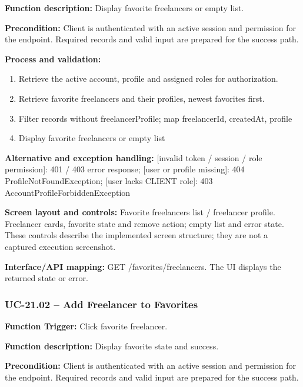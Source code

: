 \textbf{Function description:} Display favorite freelancers or empty list.

\textbf{Precondition:} Client is authenticated with an active session and permission for the endpoint. Required records and valid input are prepared for the success path.

\textbf{Process and validation:}
\begin{enumerate}
\item Retrieve the active account, profile and assigned roles for authorization.
\item Retrieve favorite freelancers and their profiles, newest favorites first.
\item Filter records without freelancer\allowbreak{}Profile; map freelancer\allowbreak{}Id, created\allowbreak{}At, profile
\item Display favorite freelancers or empty list
\end{enumerate}
\textbf{Alternative and exception handling:} [invalid token /\allowbreak{} session /\allowbreak{} role permission]: 401 /\allowbreak{} 403 error response; [user or profile missing]: 404 Profile\allowbreak{}Not\allowbreak{}Found\allowbreak{}Exception; [user lacks CLIENT role]: 403 Account\allowbreak{}Profile\allowbreak{}Forbidden\allowbreak{}Exception

\textbf{Screen layout and controls:} Favorite freelancers list /\allowbreak{} freelancer profile. Freelancer cards, favorite state and remove action; empty list and error state. These controls describe the implemented screen structure; they are not a captured execution screenshot.

\textbf{Interface/\allowbreak{}API mapping:} GET /\allowbreak{}favorites/\allowbreak{}freelancers. The UI displays the returned state or error.

\subsubsection{UC-21.02 -- Add Freelancer to Favorites}
\textbf{Function Trigger:} Click favorite freelancer.

\textbf{Function description:} Display favorite state and success.

\textbf{Precondition:} Client is authenticated with an active session and permission for the endpoint. Required records and valid input are prepared for the success path.


